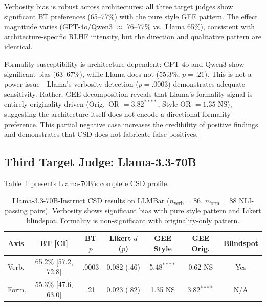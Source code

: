 \documentclass[11pt,a4paper]{article}
\newcommand{\csd}{\textsc{CSD}}
\begin{document}
Verbosity bias is robust across architectures: all three target judges show significant BT preferences (65--77\%) with the pure style GEE pattern. The effect magnitude varies (GPT-4o/Qwen3 $\approx$ 76--77\% vs.\ Llama 65\%), consistent with architecture-specific RLHF intensity, but the direction and qualitative pattern are identical.

Formality susceptibility is architecture-dependent: GPT-4o and Qwen3 show significant bias (63--67\%), while Llama does not (55.3\%, $p = .21$). This is not a power issue---Llama's verbosity detection ($p = .0003$) demonstrates adequate sensitivity. Rather, GEE decomposition reveals that Llama's formality signal is entirely originality-driven (Orig.\ OR $= 3.82^{****}$, Style OR $= 1.35$ NS), suggesting the architecture itself does not encode a directional formality preference. This partial negative case increases the credibility of positive findings and demonstrates that \csd{} does not fabricate false positives.

\subsection{Third Target Judge: Llama-3.3-70B}
\label{sec:llama}

Table~\ref{tab:llama_detail} presents Llama-70B's complete CSD profile.

\begin{table}[t]
\centering
\small
\caption{Llama-3.3-70B-Instruct CSD results on LLMBar ($n_{\text{verb}} = 86$, $n_{\text{form}} = 88$ NLI-passing pairs). Verbosity shows significant bias with pure style pattern and Likert blindspot. Formality is non-significant with originality-only pattern.}
\label{tab:llama_detail}
\begin{tabular}{lcccccc}
\toprule
\textbf{Axis} & \textbf{BT [CI]} & \textbf{BT $p$} & \textbf{Likert $d$ ($p$)} & \textbf{GEE Style} & \textbf{GEE Orig.} & \textbf{Blindspot} \\
\midrule
Verb. & 65.2\% [57.2, 72.8] & .0003 & 0.082 (.46) & 5.48$^{****}$ & 0.62 NS & Yes \\
Form. & 55.3\% [47.6, 63.0] & .21   & 0.023 (.82) & 1.35 NS       & 3.82$^{****}$ & N/A \\
\bottomrule
\end{tabular}
\end{table}
\end{document}
